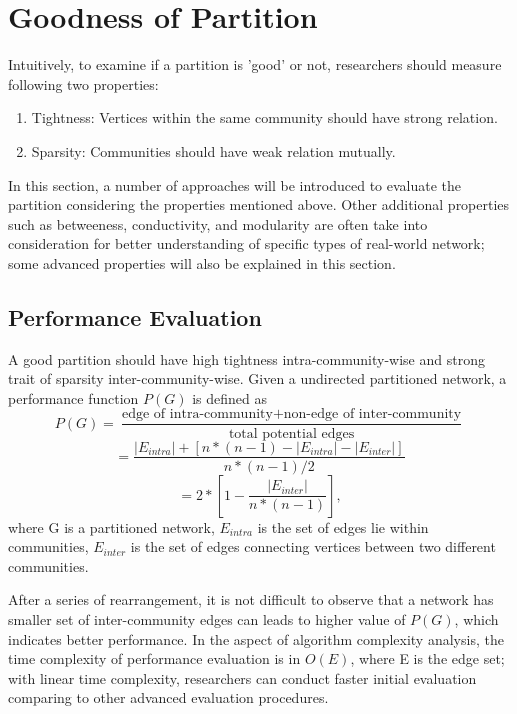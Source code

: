 \documentclass[12pt]{article}
\begin{document}
\section{Goodness of Partition}

Intuitively, to examine if a partition is 'good' or not, researchers should measure following two properties: 
\begin{enumerate}[label=(\alph*)]
\item Tightness: Vertices within the same community should have strong relation.
\item Sparsity: Communities should have weak relation mutually.
\end{enumerate}

In this section, a number of approaches will be introduced to evaluate the partition considering the properties mentioned above. Other additional properties such as betweeness, conductivity, and modularity are often take into consideration for better understanding of specific types of real-world network\cite{7,8}; some advanced properties will also be explained in this section.

\subsection{Performance Evaluation}
A good partition should have high tightness intra-community-wise and strong trait of sparsity inter-community-wise. Given a undirected partitioned network, a performance function $P(G)$ is defined as
$$P(G) = \frac{\text{edge of intra-community} + \text{non-edge of inter-community}}{\text{total potential edges}}
$$
$$
=\frac{|E_{intra}| + [n*(n-1) - |E_{intra}| - |E_{inter}|]}{n*(n-1)/2}
$$
\begin{equation}\label{eq:perf_eva3}
=2*\left[ 1 - \frac{ |E_{inter}| } { n*\left( n-1 \right) }  \right],
\end{equation}
where G is a partitioned network, $E_{intra}$ is the set of edges lie within communities, $E_{inter}$ is the set of edges connecting vertices between two different communities. 

\bigbreak

After a series of rearrangement, it is not difficult to observe that a network has smaller set of inter-community edges can leads to higher value of $P(G)$, which indicates better performance\cite{7}. In the aspect of algorithm complexity analysis, the time complexity of performance evaluation is in $O(E)$, where E is the edge set; with linear time complexity, researchers can conduct faster initial evaluation comparing to other advanced evaluation procedures. 
\end{document}
